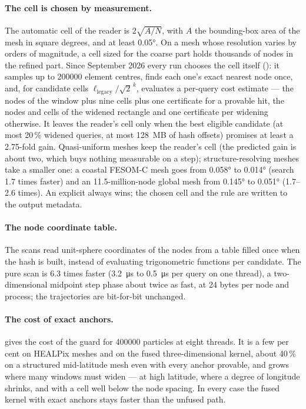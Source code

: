 \paragraph{The cell is chosen by measurement.} The automatic cell of the reader is
$2\sqrt{A/N}$, with $A$ the bounding-box area of the mesh in square degrees, and at least \ang{0.05}. On a mesh whose resolution varies by orders of magnitude, a cell
sized for the coarse part holds thousands of nodes in the refined part. Since September 2026 every
run chooses the cell itself (): it samples up to
\num{200000} element centres, finds each one's exact nearest node once, and, for candidate cells
$\ell_{\text{legacy}}/\sqrt{2}^{\,k}$, evaluates a per-query cost estimate --- the nodes of the window
plus nine cells plus one certificate for a provable hit, the nodes and cells of the widened
rectangle and one certificate per widening otherwise. It leaves the reader's cell only when the best
eligible candidate (at most 20\,\% widened queries, at most \SI{128}{MB} of hash offsets) promises at
least a 2.75-fold gain. Quasi-uniform meshes keep the reader's cell (the predicted gain is about two,
which buys nothing measurable on a step); structure-resolving meshes take a smaller one: a coastal
FESOM-C mesh goes from \ang{0.058} to \ang{0.014} (search 1.7 times faster) and an 11.5-million-node
global mesh from \ang{0.145} to \ang{0.051} (1.7--2.6 times). An explicit
 always wins; the chosen cell and the rule are written to the
output metadata.

\paragraph{The node coordinate table.} The scans read unit-sphere coordinates of the nodes from a
table filled once when the hash is built, instead of evaluating trigonometric functions per
candidate. The pure scan is 6.3 times faster (\SI{3.2}{\micro s} to \SI{0.5}{\micro s} per query on one
thread), a two-dimensional midpoint step phase about twice as fast, at 24 bytes per node and process;
the trajectories are bit-for-bit unchanged.

\paragraph{The cost of exact anchors.}  gives the cost of the guard for
\num{400000} particles at eight threads. It is a few per cent on HEALPix meshes and on the fused
three-dimensional kernel, about 40\,\% on a structured mid-latitude mesh even with every anchor provable,
and grows where many windows must widen --- at high latitude, where a degree of longitude shrinks, and with
a cell well below the node spacing. In every case the fused kernel with exact anchors stays faster
than the unfused path.

